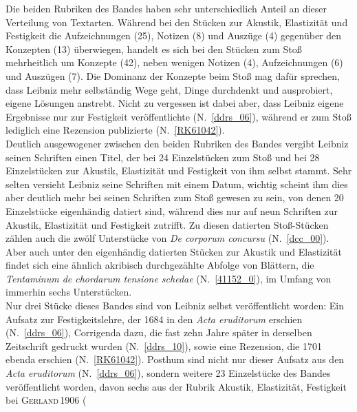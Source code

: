 Die beiden Rubriken des Bandes haben sehr unterschiedlich Anteil an dieser Verteilung von Textarten. Während bei den Stücken zur Akustik, Elastizität und Festigkeit die Aufzeichnungen (25), Notizen (8) und Auszüge (4) gegenüber den Konzepten (13) überwiegen, handelt es sich bei den Stücken zum Stoß mehrheitlich um Konzepte (42), neben wenigen Notizen (4), Aufzeichnungen (6) und Auszügen (7). Die Dominanz der Konzepte beim Stoß mag dafür sprechen, dass Leibniz mehr selbständig Wege geht, Dinge durchdenkt und ausprobiert, eigene Lösungen anstrebt. Nicht zu vergessen ist dabei aber, dass Leibniz eigene Ergebnisse nur zur Festigkeit veröffentlichte (N.~\ref{ddrs_06}), während er zum Stoß lediglich eine Rezension publizierte (N.~\ref{RK61042}).
\\ \indent
Deutlich ausgewogener zwischen den beiden Rubriken des Bandes vergibt Leibniz seinen Schriften einen Titel, der bei 24 Einzelstücken zum Stoß und bei 28 Einzelstücken zur Akustik, Elastizität und Festigkeit von ihm selbst stammt. %
Sehr selten versieht Leibniz seine Schriften mit einem Datum, wichtig scheint ihm dies aber deutlich mehr bei seinen Schriften zum Stoß gewesen zu sein, von denen 20 Einzelstücke eigenhändig datiert sind, während dies nur auf neun Schriften zur Akustik, Elastizität und Festigkeit zutrifft. Zu diesen datierten Stoß-Stücken zählen auch die zwölf Unterstücke von \textit{De corporum concursu} (N.~\ref{dcc_00}). Aber auch unter den eigenhändig datierten Stücken zur Akustik und Elastizität findet sich eine ähnlich akribisch durchgezählte Abfolge von Blättern, die \textit{Tentaminum de chordarum tensione schedae} (N.~\ref{41152_0}), im Umfang von immerhin sechs Unterstücken.
%
%
\\ \indent
Nur drei Stücke dieses Bandes sind von Leibniz selbst veröffentlicht worden: Ein Aufsatz zur Festigkeitslehre, der 1684 in den \textit{Acta eruditorum} erschien (N.~\ref{ddrs_06}), Corrigenda dazu, die fast zehn Jahre später in derselben Zeitschrift gedruckt wurden (N.~\ref{ddrs_10}), sowie eine Rezension, die 1701 ebenda erschien (N.~\ref{RK61042}). Posthum sind nicht nur dieser Aufsatz aus den \textit{Acta eruditorum} (N.~\ref{ddrs_06}), sondern weitere 23 Einzelstücke des Bandes veröffentlicht worden, davon sechs aus der Rubrik Akustik, Elastizität, Festigkeit bei \textsc{Gerland\,1906} (%
